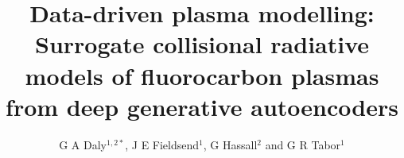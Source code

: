 \documentclass[10pt]{iopart}
\begin{document}
\title[Surrogate collisional radiative models from deep generative autoencoders]{Data-driven plasma modelling: Surrogate collisional radiative models of fluorocarbon plasmas from deep generative autoencoders}

\author{G A Daly$^{1,2*}$, J E Fieldsend$^1$, G Hassall$^{2}$ and G R Tabor$^1$}

\address{$^1$Faculty of Environment, Science and Economy, University of Exeter, North Park Road, Exeter, UK, EX4 4QF}
\address{$^2$Oxford Instruments Plasma Technology, North End, Yatton, UK, BS49 4AP}
\end{document}
